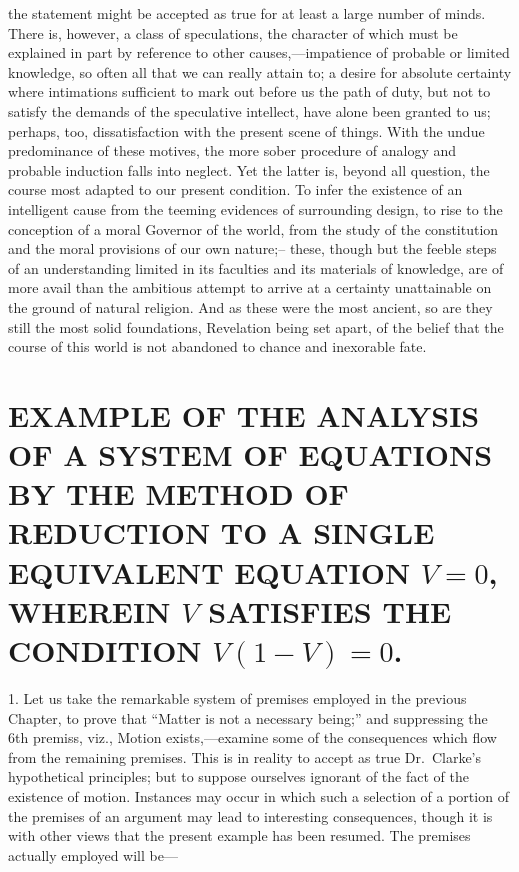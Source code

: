 \documentclass[oneside]{book}
\begin{document}
the statement might be accepted as true for at least a
large number of minds. There is, however, a class of speculations,
the character of which must be explained in part by
reference to other causes,---impatience of probable or limited
knowledge, so often all that we can really attain to; a desire for
absolute certainty where intimations sufficient to mark out before
us the path of duty, but not to satisfy the demands of the speculative
intellect, have alone been granted to us; perhaps, too,
dissatisfaction with the present scene of things. With the
undue predominance of these motives, the more sober procedure
of analogy and probable induction falls into neglect. Yet the latter
is, beyond all question, the course most adapted to our present
condition. To infer the existence of an intelligent cause
from the teeming evidences of surrounding design, to rise to the
conception of a moral Governor of the world, from the study of
the constitution and the moral provisions of our own nature;--
these, though but the feeble steps of an understanding limited
in its faculties and its materials of knowledge, are of more avail
than the ambitious attempt to arrive at a certainty unattainable
on the ground of natural religion. And as these were the most
ancient, so are they still the most solid foundations, Revelation
being set apart, of the belief that the course of this world is not
abandoned to chance and inexorable fate.




\setcounter{chapter}{13}
\chapter[EXAMPLE OF ANALYSIS]{\large EXAMPLE OF THE ANALYSIS OF A SYSTEM OF EQUATIONS BY THE
METHOD OF REDUCTION TO A SINGLE EQUIVALENT EQUATION
$V=0$, WHEREIN $V$ SATISFIES THE CONDITION $V(1-V)=0$.}

1. Let us take the remarkable system of premises employed
in the previous Chapter, to prove that ``Matter is not a
necessary being;'' and suppressing the 6th premiss, viz., Motion
exists,---examine some of the consequences which flow from the
remaining premises. This is in reality to accept as true Dr.\
Clarke's hypothetical principles; but to suppose ourselves ignorant
of the fact of the existence of motion. Instances may
occur in which such a selection of a portion of the premises of
an argument may lead to interesting consequences, though it is
with other views that the present example has been resumed. The
premises actually employed will be---
\end{document}
